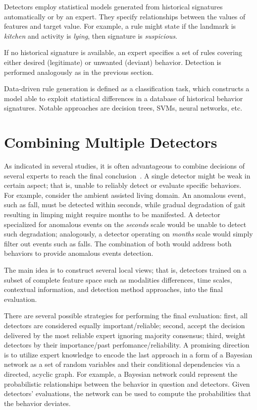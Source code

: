 Detectors employ statistical models generated from historical signatures automatically or by an expert. They specify relationships between the values of features and target value. For example, a rule might state if the landmark is \emph{kitchen} and activity is \emph{lying}, then signature is \emph{suspicious}.

If no historical signature is available, an expert specifies a set of rules covering either desired (legitimate) or unwanted (deviant) behavior. Detection is performed analogously as in the previous section.

Data-driven rule generation is defined as a classification task, which constructs a model able to exploit statistical differences in a database of historical behavior signatures. Notable approaches are decision trees, SVMs, neural networks, etc.



%
%
\section{Combining Multiple Detectors}
\label{sec:combine}

As indicated in several studies, it is often advantageous to combine decisions of several experts to reach the final conclusion~\citep{Woods1996, Gams2011principle, Vilalta02}. A single detector might be weak in certain aspect; that is, unable to reliably detect or evaluate specific behaviors. 
For example, consider the ambient assisted living domain. An anomalous event, such as fall, must be detected within seconds, while gradual degradation of gait resulting in limping might require months to be manifested. A detector specialized for anomalous events on the \textit{seconds} scale would be unable to detect such degradation; analogously, a detector  operating on \textit{months} scale would simply filter out events such as falls. The combination of both would address both behaviors to provide anomalous events detection.

The main idea is to construct several local views; that is, detectors trained on a subset of complete feature space such as modalities differences, time scales,  contextual information, and detection method approaches, into the final evaluation.


There are several possible strategies for performing the final evaluation: first, all detectors are considered equally important/reliable; second, accept the decision delivered by the most reliable expert ignoring majority consensus; third, weight detectors by their importance/past perfomance/reliability. A promising direction is to utilize expert knowledge to encode the last approach in a form of a Bayesian network as a set of random variables and their conditional dependencies via a directed, acyclic graph. For example, a Bayesian network could represent the probabilistic relationships between the behavior in question and detectors. Given detectors' evaluations, the network can be used to compute the probabilities that the behavior deviates.


